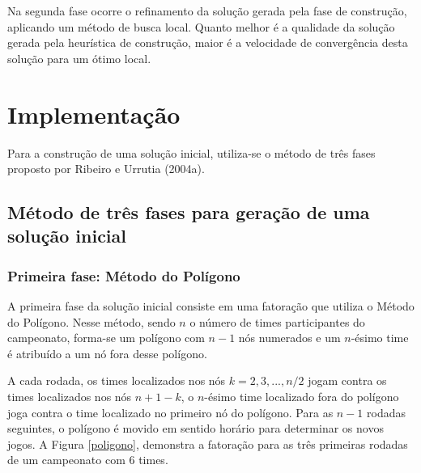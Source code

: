 \documentclass[12pt,a4paper]{article}
\begin{document}

Na segunda fase ocorre o refinamento da solução gerada pela fase de construção, aplicando um método de busca local. Quanto melhor é a qualidade da solução gerada pela heurística de construção, maior é a velocidade de convergência desta solução para um ótimo local.


\section{Implementação}

Para a construção de uma solução inicial, utiliza-se o método de três fases proposto por Ribeiro e Urrutia (2004a)\cite{urrutia:heuristics}.

\subsection{Método de três fases para geração de uma solução inicial}

\subsubsection{Primeira fase: Método do Polígono}

A primeira fase da solução inicial consiste em uma fatoração que utiliza o Método do Polígono. Nesse método, sendo $n$ o número de times participantes do campeonato, forma-se um polígono com $n-1$ nós numerados e um $n$-ésimo time é atribuído a um nó fora desse polígono.

A cada rodada, os times localizados nos nós $k=2,3,...,n/2$ jogam contra os times localizados nos nós $n+1-k$, o $n$-ésimo time localizado fora do polígono joga contra o time localizado no primeiro nó do polígono. Para as $n-1$ rodadas seguintes, o polígono é movido em sentido horário para determinar os novos jogos. A Figura \ref{poligono}, demonstra a fatoração para as três primeiras rodadas de um campeonato com $6$ times.
\end{document}
